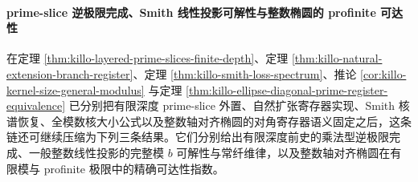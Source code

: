 \paragraph{prime-slice 逆极限完成、Smith 线性投影可解性与整数椭圆的 profinite 可达性}
在定理 \ref{thm:killo-layered-prime-slices-finite-depth}、定理
\ref{thm:killo-natural-extension-branch-register}、定理
\ref{thm:killo-smith-loss-spectrum}、推论
\ref{cor:killo-kernel-size-general-modulus} 与定理
\ref{thm:killo-ellipse-diagonal-prime-register-equivalence} 已分别把有限深度 prime-slice 外置、自然扩张寄存器实现、Smith 核谱恢复、全模数核大小公式以及整数轴对齐椭圆的对角寄存器语义固定之后，这条链还可继续压缩为下列三条结果。它们分别给出有限深度前史的乘法型逆极限完成、一般整数线性投影的完整模 \(b\) 可解性与常纤维律，以及整数轴对齐椭圆在有限模与 profinite 极限中的精确可达性指数。

